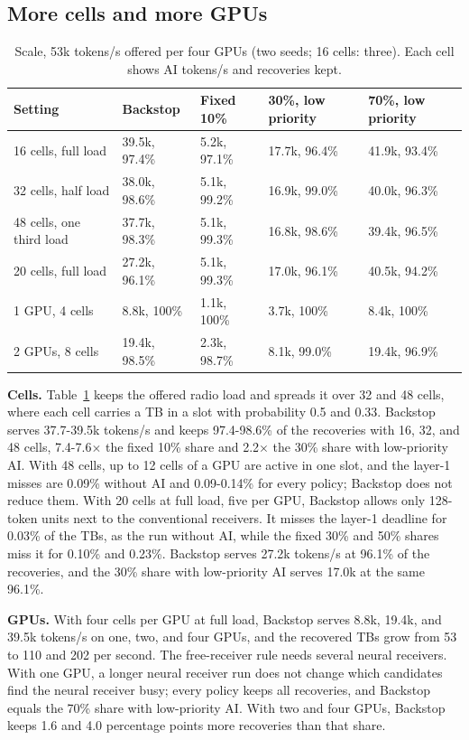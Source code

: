 \documentclass[acmsmall,screen,review,anonymous]{acmart}
\newcommand{\sys}{Backstop\xspace}
\begin{document}
\subsection{More cells and more GPUs}

\begin{table}[t]
\caption{Scale, 53k tokens/s offered per four GPUs (two seeds; 16 cells: three). Each cell shows AI tokens/s
and recoveries kept.}
\label{tab:scale}
\footnotesize
\begin{tabular}{@{}lllll@{}}
\toprule
Setting & \sys & Fixed 10\% & 30\%, low priority & 70\%, low priority \\
\midrule
16 cells, full load & 39.5k, 97.4\% & 5.2k, 97.1\% & 17.7k, 96.4\% & 41.9k, 93.4\% \\
32 cells, half load & 38.0k, 98.6\% & 5.1k, 99.2\% & 16.9k, 99.0\% & 40.0k, 96.3\% \\
48 cells, one third load & 37.7k, 98.3\% & 5.1k, 99.3\% & 16.8k, 98.6\% & 39.4k, 96.5\% \\
20 cells, full load & 27.2k, 96.1\% & 5.1k, 99.3\% & 17.0k, 96.1\% & 40.5k, 94.2\% \\
\midrule
1 GPU, 4 cells & 8.8k, 100\% & 1.1k, 100\% & 3.7k, 100\% & 8.4k, 100\% \\
2 GPUs, 8 cells & 19.4k, 98.5\% & 2.3k, 98.7\% & 8.1k, 99.0\% & 19.4k, 96.9\% \\
\bottomrule
\end{tabular}
\end{table}

\noindent\textbf{Cells.} Table~\ref{tab:scale} keeps the offered radio load and spreads it over 32 and 48
cells, where each cell carries a TB in a slot with probability 0.5 and 0.33. \sys serves 37.7-39.5k tokens/s
and keeps 97.4-98.6\% of the recoveries with 16, 32, and 48 cells, 7.4-7.6$\times$ the fixed 10\% share and
2.2$\times$ the 30\% share with low-priority AI. With 48 cells, up to 12 cells of a GPU are active in one
slot, and the layer-1 misses are 0.09\% without AI and 0.09-0.14\% for every policy; \sys does not reduce
them. With 20 cells at full load, five per GPU, \sys allows only 128-token units next to the conventional
receivers. It misses the layer-1 deadline for 0.03\% of the TBs, as the run without AI, while the fixed 30\%
and 50\% shares miss it for 0.10\% and 0.23\%. \sys serves 27.2k tokens/s at 96.1\% of the recoveries, and
the 30\% share with low-priority AI serves 17.0k at the same 96.1\%.

\noindent\textbf{GPUs.} With four cells per GPU at full load, \sys serves 8.8k, 19.4k, and 39.5k tokens/s
on one, two, and four GPUs, and the recovered TBs grow from 53 to 110 and 202 per second. The free-receiver
rule needs several neural receivers. With one GPU, a longer neural receiver run does not change which
candidates find the neural receiver busy; every policy keeps all recoveries, and \sys equals the 70\% share
with low-priority AI. With two and four GPUs, \sys keeps 1.6 and 4.0 percentage points more recoveries than
that share.
\end{document}
